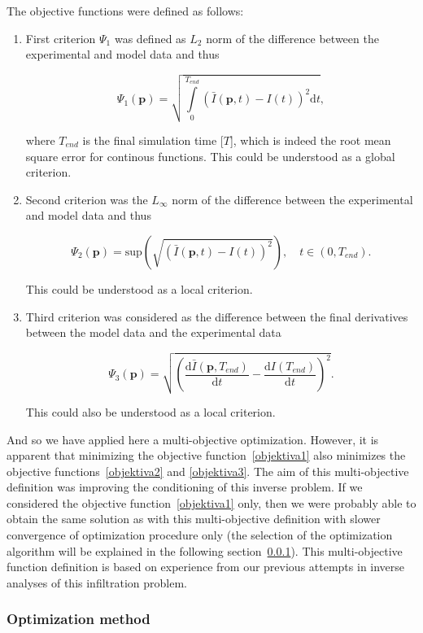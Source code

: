 \documentclass[review]{myarticle}
\newenvironment{lineq}
    {\begin{linenomath*}
    \begin{equation}
    }
    { 
    \end{equation} 
    \end{linenomath*}
    }
\newcommand{\dd}{\mathrm{d}}
\renewcommand{\vec}{\mathbf}
\begin{document}
The objective functions were defined as follows:
\begin{enumerate}[label={\bf \Roman*}.]
\item First criterion $\Psi_1$ was defined as $L_2$ norm of the difference between the  experimental and model data and thus
\begin{lineq}
\label{objektiva1}
\Psi_1 (\vec{p}) = \sqrt{\int\limits_0^{T_{end}} \left( \bar{I}(\vec{p},t) - I(t) \right)^2 \dd t},
\end{lineq}
where $T_{end}$ is the final simulation time [$T$], which is indeed the root mean square error for continous functions. This could be understood as a global criterion.
\item Second criterion was the $L_{\infty}$ norm of the difference between the experimental and model data and thus
\begin{lineq}
\label{objektiva2}
\Psi_2 (\vec{p}) = \mathrm{sup} \left( \sqrt{\left( \bar{I}(\vec{p},t) - I(t) \right)^2} \right), \quad  t \in (0, T_{end}).
\end{lineq}
This could be understood as a local criterion.
\item Third criterion was considered as the difference between the final derivatives between the model data and the experimental data
\begin{lineq}
\label{objektiva3}
\Psi_3 (\vec{p}) =  \sqrt{\left( \frac{\dd \bar{I}(\vec{p},T_{end})}{\dd t} - \frac{\dd I(T_{end})}{\dd t} \right)^2}.
\end{lineq}
This could also be understood as a local criterion.

\end{enumerate}
And so we have applied here a multi-objective optimization. However, it is apparent that minimizing the objective function~\eqref{objektiva1} also minimizes the objective functions~\eqref{objektiva2} and  \eqref{objektiva3}. The aim of this multi-objective definition was improving the conditioning of this inverse problem. If we considered the objective function~\eqref{objektiva1} only, then we were probably able to obtain the same solution as with this multi-objective definition with slower convergence of optimization procedure only (the selection of the optimization algorithm will be explained in the following section~\ref{optima}). This multi-objective function definition is based on experience from our previous attempts in inverse analyses of this infiltration problem.



\subsubsection{Optimization method}%
\label{optima}
\end{document}
